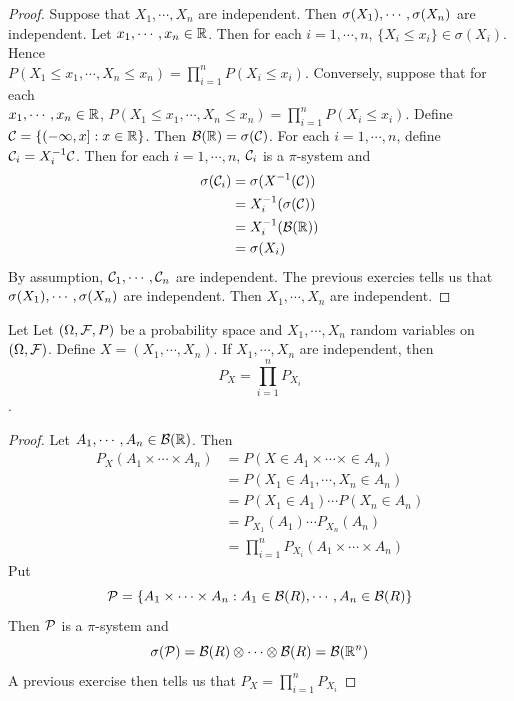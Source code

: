 \documentclass{book}
\begin{document}
	\begin{proof}
		Suppose that $X_1, \cdots, X_n$ are independent. Then $\sigma(X_1), \cdots, \sigma(X_n)$ are independent. Let $x_1, \cdots, x_n \in \mathbb{R}$. Then for each $i=1, \cdots, n$, $\{X_i \leq x_i\} \in \sigma(X_i)$. Hence \\$P(X_1 \leq x_1, \cdots, X_n \leq x_n ) = \prod\limits_{i=1}^nP(X_i \leq x_i)$. Conversely, suppose that for each \\$x_1, \cdots, x_n \in \mathbb{R}$, $P(X_1 \leq x_1, \cdots, X_n \leq x_n ) = \prod\limits_{i=1}^nP(X_i \leq x_i)$. Define $\mathcal{C} = \{ (-\infty, x]: x \in \mathbb{R} \}$. Then $\mathcal{B}(\mathbb{R}) = \sigma(\mathcal{C})$. For each $i =1, \cdots, n$, define $\mathcal{C}_i = X_i^{-1}\mathcal{C}$. Then for each $i =1, \cdots, n$, $\mathcal{C}_i$ is a $\pi$-system and 
		\begin{align*}
			\sigma(\mathcal{C}_i) 
			&= \sigma(X^{-1}(\mathcal{C})) \\
			&= X_i^{-1}(\sigma(\mathcal{C})) \\
			&= X_i^{-1}(\mathcal{B}(\mathbb{R})) \\
			&= \sigma(X_i)
		\end{align*}
		By assumption, $\mathcal{C}_1, \cdots, \mathcal{C}_n$ are independent. The previous exercies tells us that $\sigma(X_1), \cdots, \sigma(X_n)$ are independent. Then $X_1, \cdots, X_n$ are independent. 
	\end{proof}
	
	\begin{ex}
		Let Let $(\Omega, \mathcal{F}, P)$ be a probability space and $X_1, \cdots, X_n$ random variables on $(\Omega, \mathcal{F})$. Define $X = (X_1, \cdots, X_n)$. If $X_1, \cdots, X_n$ are independent, then $$P_{X} = \prod\limits_{i=1}^nP_{X_i}$$.
	\end{ex}
	
	\begin{proof}
		Let $A_1, \cdots, A_n \in \mathcal{B}(\mathbb{R})$. Then 
		\begin{align*}
			P_X(A_1 \times \cdots \times A_n) 
			&= P(X \in A_1 \times \cdots \times \in A_n)\\
			&= P(X_1 \in A_1, \cdots, X_n \in A_n) \\
			&= P(X_1 \in A_1) \cdots P(X_n \in A_n) \\
			&= P_{X_1}(A_1) \cdots P_{X_n}(A_n) \\
			&= \prod_{i=1}^nP_{X_i}(A_1 \times \cdots \times  A_n)
		\end{align*}
		Put $$\mathcal{P} = \{ A_1 \times \cdots \times A_n: A_1 \in \mathcal{B}(R), \cdots, A_n \in \mathcal{B}(R) \}$$ Then $\mathcal{P}$ is a $\pi$-system and $$\sigma(\mathcal{P}) = \mathcal{B}(R) \otimes \cdots \otimes \mathcal{B}(R) = \mathcal{B}(\mathbb{R}^n)$$
		A previous exercise then tells us that $P_X = \prod\limits_{i=1}^nP_{X_i}$ 
	\end{proof}
	
\end{document}
